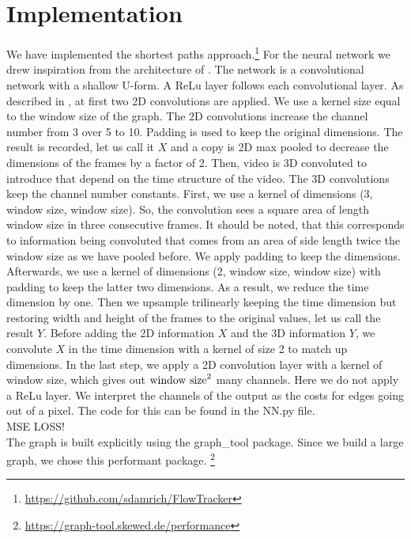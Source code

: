 \documentclass{article}
\begin{document}
\section{Implementation}
We have implemented the shortest paths approach.\footnote{\url{https://github.com/sdamrich/FlowTracker}}  For the neural network we drew inspiration from the architecture of \cite{Lee17}. The network is a convolutional network with a shallow U-form. A ReLu layer follows each convolutional layer. As described in \cite{Lee17}, at first two 2D convolutions are applied. We use a kernel size equal to the window size of the graph. The 2D convolutions increase the channel number from 3 over 5 to 10. Padding is used to keep the original dimensions. The result is recorded, let us call it $X$ and a copy is 2D max pooled to decrease the dimensions of the frames by a factor of 2. Then, video is 3D convoluted to introduce that depend on the time structure of the video. The 3D convolutions keep the channel number constants.  First, we use a kernel of dimensions (3, window size, window size). So, the convolution sees a square area of length window size in three consecutive frames. It should be noted, that this corresponds to information being convoluted that comes from an area of side length twice the window size as we have pooled before. We apply padding to keep the dimensions. Afterwards, we use a kernel of dimensions (2, window size, window size) with padding to keep the latter two dimensions. As a result, we reduce the time dimension by one. Then we upsample trilinearly keeping the time dimension but restoring width and height of the frames to the original values, let us call the result $Y$. Before adding the 2D information $X$ and the 3D information $Y$, we convolute $X$ in the time dimension with a kernel of size 2 to match up dimensions. 
In the last step, we apply a 2D convolution layer with a kernel of window size, which gives out $\textnormal{window size}^2$ many channels. Here we do not apply a ReLu layer. We interpret the channels of the output as the costs for edges going out of a pixel. The code for this can be found in the NN.py file.\\ 

MSE LOSS!
\\
The graph is built explicitly using the 
graph\_tool package. Since we build a large graph, we chose this performant package. \footnote{\url{https://graph-tool.skewed.de/performance}}




\end{document}
